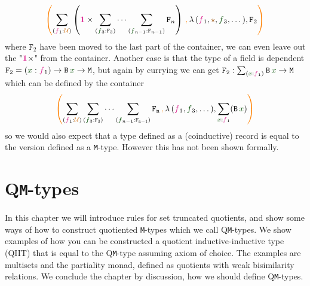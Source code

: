 \documentclass[twoside,11pt,openright]{report}
\theoremstyle{plain} %
\theoremstyle{definition}
\theoremstyle{remark}
\newcommand*{\term}[1]{\textcolor{green!30!black}{#1}} %
\newcommand*{\type}[1]{\textcolor{magenta!90!black}{#1}}
\newcommand*{\containerpair}[2]{\ensuremath{\colorlet{savedleftcolor}{.}\color{orange}\left(\color{savedleftcolor}#1\,\textcolor{orange}{\mathbf{,}}\,#2\color{orange}\right)\color{savedleftcolor}}}
\newcommand*{\universe}[1]{\textcolor{orange!80!black}{#1}}
\newcommand*{\unit}{\type{\textbf{1}}}
\newcommand*{\constant}[1]{\textcolor{orange!60!black}{\ensuremath{\mathtt{#1}}}}
\newcommand*{\typeformer}[1]{\ensuremath{\mathtt{#1}}}
\newcommand*{\unitelem}{\constant{\star}} %
\begin{document}
\begin{equation}
  \containerpair{\sum_{(\type{f}_1 : \universe{\mathcal{U}})} \left(\unit \times \sum_{(\term{f}_3 : \typeformer{F}_3)} \cdots \sum_{(\term{f}_{n-1} : \typeformer{F}_{n-1})}\typeformer{F}_n\right)}{\lambda\,(\type{f}_1,\unitelem,\term{f}_3,\dots),\typeformer{F}_2}
\end{equation}
where \(\typeformer{F}_2\) have been moved to the last part of the container, we can even leave out the "\(\unit \times\)" from the container. Another case is that the type of a field is dependent \(\typeformer{F_2} = (\term{x} : \type{f}_1) \rightarrow \typeformer{B}\,\term{x} \rightarrow \mathtt{M}\), but again by currying we can get \(\typeformer{F_2} : \sum_{(\term{x} : \type{f}_1)} \typeformer{B}\,\term{x} \rightarrow \mathtt{M}\) which can be defined by the container
\begin{equation}
  \containerpair{\sum_{(\type{f}_1 : \universe{\mathcal{U}})} \sum_{(\term{f}_3 : \typeformer{F_3})} \cdots \sum_{(\term{f}_{n-1} : \typeformer{F_{n-1}})}\typeformer{F_n}}{\lambda\,(\type{f}_1,\term{f}_3,\dots),\sum_{\term{x} : \type{f}_1} (\typeformer{B}\,\term{x})}
\end{equation}
so we would also expect that a type defined as a (coinductive) record is equal to the version defined as a \texttt{M}-type. However this has not been shown formally. 


\chapter{Q\texttt{M}-types}
\label{ch:QM-types}
In this chapter we will introduce rules for set truncated quotients, and show some ways of how to construct quotiented \texttt{M}-types which we call Q\texttt{M}-types. We show examples of how you can be constructed a quotient inductive-inductive type (QIIT) that is equal to the Q\texttt{M}-type assuming axiom of choice. The examples are multisets and the partiality monad, defined as quotients with weak bisimilarity relations. We conclude the chapter by discussion, how we should define Q\texttt{M}-types.
\end{document}
